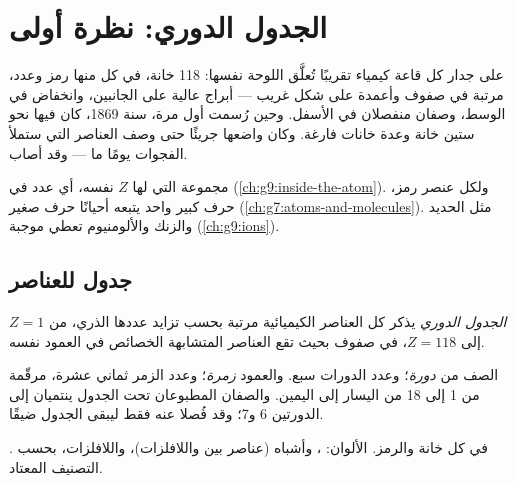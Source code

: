 \chapter{الجدول الدوري: نظرة أولى}\label{ch:g9:periodic-table-first-look}

على جدار كل قاعة كيمياء تقريبًا تُعلَّق اللوحة نفسها: 118 خانة، في كل منها
رمز وعدد، مرتبة في صفوف وأعمدة على شكل غريب --- أبراج عالية على الجانبين،
وانخفاض في الوسط، وصفان منفصلان في الأسفل. وحين رُسمت أول مرة، سنة 1869،
كان فيها نحو ستين خانة وعدة خانات فارغة. وكان واضعها جريئًا حتى وصف العناصر
التي ستملأ الفجوات يومًا ما --- وقد أصاب.

\begin{recall}
 مجموعة  التي لها  $Z$ نفسه، أي عدد
 في  (\cref{ch:g9:inside-the-atom}). ولكل عنصر رمز، حرف
كبير واحد يتبعه أحيانًا حرف صغير (\cref{ch:g7:atoms-and-molecules}).
 مثل الحديد والزنك والألومنيوم تعطي  موجبة
(\cref{ch:g9:ions}).
\end{recall}

\section{جدول للعناصر}

\begin{definition}\label{def:g9:periodic-table-first-look:periodic-table}
\emph{الجدول الدوري} يذكر كل العناصر الكيميائية مرتبة
بحسب تزايد عددها الذري، من $Z = 1$ إلى $Z = 118$، في صفوف بحيث تقع العناصر
المتشابهة الخصائص في العمود نفسه.
\end{definition}

\begin{definition}\label{def:g9:periodic-table-first-look:period}
الصف من  \emph{دورة}؛ وعدد الدورات سبع. والعمود
\emph{زمرة}؛ وعدد الزمر ثماني عشرة، مرقّمة من 1 إلى 18 من
اليسار إلى اليمين. والصفان المطبوعان تحت الجدول ينتميان إلى الدورتين 6 و7؛
وقد فُصلا عنه فقط ليبقى الجدول ضيقًا.
\end{definition}

\begin{omfigure}
\omperiodictable[colour=metals, legend=true, cell=0.86cm]

{\small {}. في كل خانة  والرمز. الألوان: ،
وأشباه  (عناصر بين  واللافلزات)، واللافلزات، بحسب التصنيف
المعتاد.}
\end{omfigure}

